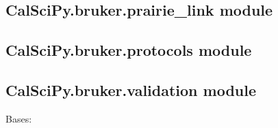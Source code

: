 \documentclass[letterpaper,10pt,english]{sphinxmanual}
\begin{document}
\sphinxstepscope


\subsection{CalSciPy.bruker.prairie\_link module}
\label{\detokenize{CalSciPy.bruker.prairie_link:calscipy-bruker-prairie-link-module}}\label{\detokenize{CalSciPy.bruker.prairie_link::doc}}
\sphinxstepscope


\subsection{CalSciPy.bruker.protocols module}
\label{\detokenize{CalSciPy.bruker.protocols:module-CalSciPy.bruker.protocols}}\label{\detokenize{CalSciPy.bruker.protocols:calscipy-bruker-protocols-module}}\label{\detokenize{CalSciPy.bruker.protocols::doc}}
\sphinxstepscope


\subsection{CalSciPy.bruker.validation module}
\label{\detokenize{CalSciPy.bruker.validation:module-CalSciPy.bruker.validation}}\label{\detokenize{CalSciPy.bruker.validation:calscipy-bruker-validation-module}}\label{\detokenize{CalSciPy.bruker.validation::doc}}

\begin{fulllineitems}
\label{\detokenize{CalSciPy.bruker.validation:CalSciPy.bruker.validation.DingusException}}
\pysigstartsignatures
{}
\pysigstopsignatures
\sphinxAtStartPar
Bases: 

\end{fulllineitems}
\end{document}
